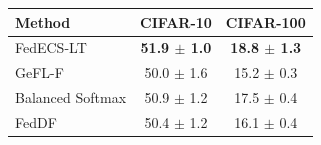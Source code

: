 \begin{tabular}{lcc}
\toprule
Method & CIFAR-10 & CIFAR-100\\
\midrule
FedECS-LT & \textbf{51.9 $\pm$ 1.0} & \textbf{18.8 $\pm$ 1.3}\\
GeFL-F & 50.0 $\pm$ 1.6 & 15.2 $\pm$ 0.3\\
Balanced Softmax & 50.9 $\pm$ 1.2 & 17.5 $\pm$ 0.4\\
FedDF & 50.4 $\pm$ 1.2 & 16.1 $\pm$ 0.4\\
\bottomrule
\end{tabular}
